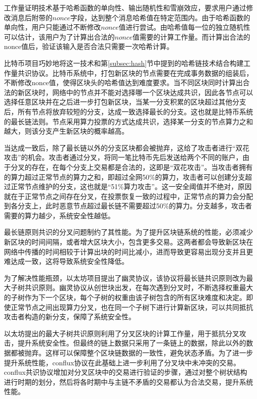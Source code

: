 工作量证明技术基于哈希函数的单向性、输出随机性和雪崩效应，要求用户通过修改消息后附带的$nonce$字段，达到整个消息哈希值在特定范围内。由于哈希函数的单向性，用户只能通过不断修改$nonce$值进行尝试。由哈希值每一位的独立随机性可以估计，该用户为了计算出合法的$nonce$值需要的计算工作量。而计算出合法的nonce值后，验证该输入是否合法只需要一次哈希计算。

比特币项目巧妙地将这一技术和第\ref{subsec:hash}节中提到的哈希链技术结合构建工作量共识协议。比特币系统中，打包新区块的节点需要在完成事务数据的组装后，不断修改nonce值，使得区块头的哈希值达到难度要求。当不同区块同时计算出合法的新区块时，网络中的节点并不能对选择哪一个区块达成共识，因此各节点可以选择任意区块并在之后进一步打包新区块，当某一分支积累的区块超过其他分支后，所有节点将放弃较短的分支，达成一致选择最长的分支。这也就是比特币系统的最长链法则。节点采用算力投票的方式达成共识，选择某一分支的节点算力之和越大，则该分支产生新区块的概率越高。

当达成一致后，除了最长链以外的分支区块都会被抛弃，这给了攻击者进行“双花攻击”的机会。攻击者通过分叉，将同一笔比特币先后发送给两个不同的账户，由于分叉的存在，在每个分支上交易都是合法的，这即是“双花攻击”。当攻击者拥有的算力超过正常节点的算力之和，即超过全网50\%的算力，攻击者可以创建分支超过正常节点维护的分支，这也就是“51\%算力攻击”。这一安全阈值并不绝对，原因就在于正常节点之间存在分叉，在投票恢复一致的过程中，正常节点的算力会分配到各分支上，此时恶意节点超过最长链不需要超过50\%的算力。分支越多，攻击者需要的算力越少，系统安全性越低。

最长链原则共识的分叉问题制约了其性能。为了提升区块链系统的性能，必须减少新区块的时间间隔，或者增大区块大小，包含更多交易。这两者都会导致新区块在网络中传播的时间相较于计算出块的时间比减小，进而导致更容易出现分支并且更难达成一致，这将导致系统安全性降低。

为了解决性能瓶颈，以太坊项目提出了幽灵协议，该协议将最长链共识原则改为最大子树共识原则。幽灵协议从创世块出发，在每次遇到分叉时，不断选择权重最大的子树作为下一个区块，每个子树的权重由该子树包含的所有区块难度和决定。即使正常节点之间出现算力分叉，也在同一个子树下进行计算新区块，可以共同抵抗攻击者构造的新分支，保障了系统安全性。

以太坊提出的最大子树共识原则利用了分叉区块的计算工作量，用于抵抗分叉攻击，提升系统安全性。但最终的链上数据只采用了一条链上的数据，除此以外的数据都被抛弃。这样可以保障整个区块链数据的一致性，避免状态矛盾。为了进一步提升系统性能，conflux协议在此基础上进一步利用了分叉块中未冲突的交易。conflux共识协议增加对分叉区块中的交易进行验证的步骤，通过对整个树状结构进行时期的划分，然后将各时期中与主链不矛盾的交易都认为合法交易，提升系统性能。

